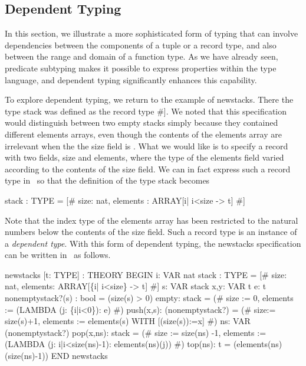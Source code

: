 \subsection{Dependent Typing}
\label{dependent-typing}

In this section, we illustrate a more sophisticated form of typing that
can involve dependencies between the components of a tuple or a record
type, and also between the range and domain of a function type.  As we
have already seen, predicate subtyping makes it possible to express
properties within the type language, and dependent typing significantly
enhances this capability.

To explore dependent typing, we return to the example of {\stt
newstacks}.  There the type {\stt stack} was defined as the record type
{\stt [\# size:\ nat, elements :\ ARRAY[nat -> t] \#]}.  We noted that this
specification would distinguish between two empty stacks simply because
they contained different {\stt elements} arrays, even though the contents
of the {\stt elements} array are irrelevant when the the {\stt size} field
is {}.  What we would like is to specify a record with two fields,
{\stt size} and {\stt elements}, where the type of the {\stt elements}
field varied according to the contents of the {\stt size} field.  We can
in fact express such a record type in \pvs\ so that the definition of
the type {\stt stack} becomes
\begin{pvsexample}
  stack : TYPE =
      [# size: nat, elements : ARRAY[{i| i<size} -> t] #]
\end{pvsexample}
%
Note that the index type of the {\stt elements} array has been restricted
to the natural numbers below the contents of the {\stt size} field.  Such
a record type is an instance of a {\em dependent type\/}.  With this
form of dependent typing, the {\stt newstacks} specification can be
written in \pvs\ as follows.
\begin{pvsexample}
  newstacks [t: TYPE] : THEORY 
   BEGIN
    i: VAR nat
    stack : TYPE = [# size: nat, elements: ARRAY[\{i| i<size\} -> t] #]
    s: VAR stack
    x,y: VAR t
    e: t
    nonemptystack?(s) : bool = (size(s) > 0)
    empty: stack =
      (# size := 0, elements := (LAMBDA (j: \{i|i<0\}): e) #)
    push(x,s): (nonemptystack?) =
      (# size:= size(s)+1,
         elements := elements(s) WITH [(size(s)):=x] #)
    ns: VAR (nonemptystack?)
    pop(x,ns): stack = 
      (# size := size(ns) -1,
         elements := (LAMBDA (j: {i|i<size(ns)-1}):
                     elements(ns)(j)) #)
    top(ns): t = (elements(ns)(size(ns)-1))
   END newstacks 
\end{pvsexample}


